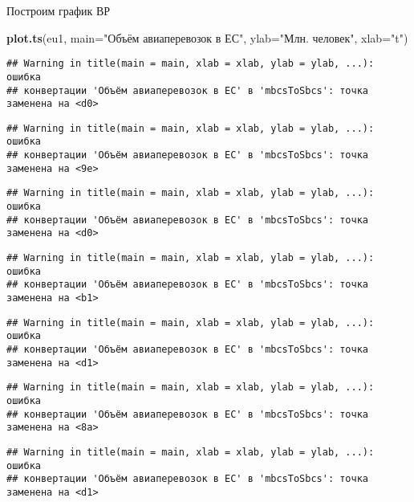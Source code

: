 \documentclass[
]{article}
\newenvironment{Shaded}{\begin{snugshade}}{\end{snugshade}}
\newcommand{\AttributeTok}[1]{\textcolor[rgb]{0.13,0.29,0.53}{#1}}
\newcommand{\FunctionTok}[1]{\textcolor[rgb]{0.13,0.29,0.53}{\textbf{#1}}}
\newcommand{\NormalTok}[1]{#1}
\newcommand{\StringTok}[1]{\textcolor[rgb]{0.31,0.60,0.02}{#1}}
\begin{document}
Построим график ВР

\begin{Shaded}
\begin{Highlighting}[]
\FunctionTok{plot.ts}\NormalTok{(eu1,}
     \AttributeTok{main=}\StringTok{"Объём авиаперевозок в ЕС"}\NormalTok{,}
     \AttributeTok{ylab=}\StringTok{"Млн. человек"}\NormalTok{, }
     \AttributeTok{xlab=}\StringTok{"t"}\NormalTok{)}
\end{Highlighting}
\end{Shaded}

\begin{verbatim}
## Warning in title(main = main, xlab = xlab, ylab = ylab, ...): ошибка
## конвертации 'Объём авиаперевозок в ЕС' в 'mbcsToSbcs': точка заменена на <d0>
\end{verbatim}

\begin{verbatim}
## Warning in title(main = main, xlab = xlab, ylab = ylab, ...): ошибка
## конвертации 'Объём авиаперевозок в ЕС' в 'mbcsToSbcs': точка заменена на <9e>
\end{verbatim}

\begin{verbatim}
## Warning in title(main = main, xlab = xlab, ylab = ylab, ...): ошибка
## конвертации 'Объём авиаперевозок в ЕС' в 'mbcsToSbcs': точка заменена на <d0>
\end{verbatim}

\begin{verbatim}
## Warning in title(main = main, xlab = xlab, ylab = ylab, ...): ошибка
## конвертации 'Объём авиаперевозок в ЕС' в 'mbcsToSbcs': точка заменена на <b1>
\end{verbatim}

\begin{verbatim}
## Warning in title(main = main, xlab = xlab, ylab = ylab, ...): ошибка
## конвертации 'Объём авиаперевозок в ЕС' в 'mbcsToSbcs': точка заменена на <d1>
\end{verbatim}

\begin{verbatim}
## Warning in title(main = main, xlab = xlab, ylab = ylab, ...): ошибка
## конвертации 'Объём авиаперевозок в ЕС' в 'mbcsToSbcs': точка заменена на <8a>
\end{verbatim}

\begin{verbatim}
## Warning in title(main = main, xlab = xlab, ylab = ylab, ...): ошибка
## конвертации 'Объём авиаперевозок в ЕС' в 'mbcsToSbcs': точка заменена на <d1>
\end{verbatim}
\end{document}
